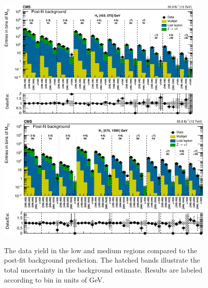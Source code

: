 \begin{figure}
	\centering
	\includegraphics[width=0.90\textwidth]{results/figs/postfit/mt2_lowHT_fullEstimate}
	\includegraphics[width=0.95\textwidth]{results/figs/postfit/mt2_mediumHT_fullEstimate}
	\caption{The data yield in the low \HT and medium \HT regions compared to the post-fit background prediction. The hatched bands illustrate the total uncertainty in the background estimate. Results are labeled according to \mttwo bin in units of GeV.}
	\label{fig:yieldPostfit2}
\end{figure}
